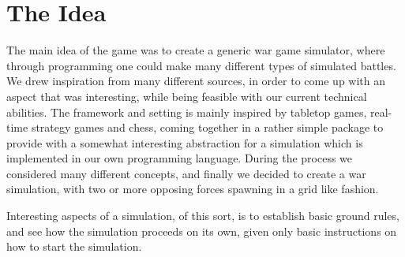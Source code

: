 \section{The Idea}
	The main idea of the game was to create a generic war game simulator, where through programming one could make many different types of 
	simulated battles. We drew inspiration from many different sources, in order to come up with an aspect that was interesting, while being feasible with our current technical abilities. The framework and setting is mainly inspired by tabletop games, real-time strategy games and chess, coming together in a rather simple package to provide with a somewhat interesting abstraction for a simulation which is implemented in our own programming language.
	During the process we considered many different concepts, and finally we decided to create a war simulation, with two or more opposing forces spawning in a grid like fashion. 
	
Interesting aspects of a simulation, of this sort, is to establish basic ground rules, and see how the simulation proceeds on its own, given only basic instructions on how to start the simulation.